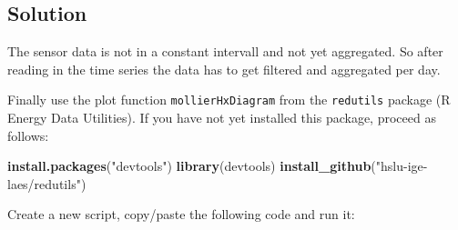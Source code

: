 \documentclass[
  a4paperpaper,
]{book}
\newenvironment{Shaded}{\begin{snugshade}}{\end{snugshade}}
\newcommand{\KeywordTok}[1]{\textcolor[rgb]{0.13,0.29,0.53}{\textbf{#1}}}
\newcommand{\NormalTok}[1]{#1}
\newcommand{\StringTok}[1]{\textcolor[rgb]{0.31,0.60,0.02}{#1}}
\let\oldShaded\Shaded
\let\endoldShaded\endShaded
\renewenvironment{Shaded}{\footnotesize\oldShaded}{\endoldShaded}
\begin{document}
\newpage

\hypertarget{solution-18}{%
\subsection{Solution}\label{solution-18}}

The sensor data is not in a constant intervall and not yet aggregated. So after reading in the time series the data has to get filtered and aggregated per day.

Finally use the plot function \texttt{mollierHxDiagram} from the \texttt{redutils} package (R Energy Data Utilities).
If you have not yet installed this package, proceed as follows:

\begin{Shaded}
\begin{Highlighting}[]
\KeywordTok{install.packages}\NormalTok{(}\StringTok{"devtools"}\NormalTok{)}
\KeywordTok{library}\NormalTok{(devtools)}
\KeywordTok{install_github}\NormalTok{(}\StringTok{"hslu-ige-laes/redutils"}\NormalTok{)}
\end{Highlighting}
\end{Shaded}

Create a new script, copy/paste the following code and run it:
\end{document}
